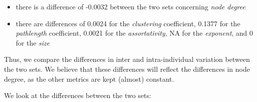 \documentclass[
]{article}
\providecommand{\tightlist}{%
  \setlength{\itemsep}{0pt}\setlength{\parskip}{0pt}}
\begin{document}
\begin{itemize}
\tightlist
\item
  there is a difference of -0.0032 between the two sets concerning
  \emph{node degree}
\item
  there are differences of 0.0024 for the \emph{clustering} coefficient,
  0.1377 for the \emph{pathlength} coefficient, 0.0021 for the
  \emph{assortativity}, NA for the \emph{exponent}, and 0 for the
  \emph{size}
\end{itemize}

Thus, we compare the differences in inter and intra-individual variation
between the two sets. We believe that these differences will reflect the
differences in node degree, as the other metrics are kept (almost)
constant.

We look at the differences between the two sets:
\end{document}
